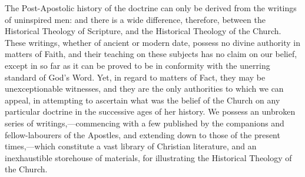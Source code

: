 \documentclass[
]{book}
\begin{document}
The Post-Apostolic history of the doctrine can only be derived from the writings of uninspired men: and there is a wide difference, therefore, between the Historical Theology of Scripture, and the Historical Theology of the Church. These writings, whether of ancient or modern date, possess no divine authority in matters of Faith, and their teaching on these subjects has no claim on our belief, except in so far as it can be proved to be in conformity with the unerring standard of God's Word. Yet, in regard to matters of Fact, they may be unexceptionable witnesses, and they are the only authorities to which we can appeal, in attempting to ascertain what was the belief of the Church on any particular doctrine in the successive ages of her history. We possess an unbroken series of writings,---commencing with a few published by the companions and fellow-labourers of the Apostles, and extending down to those of the present times,---which constitute a vast library of Christian literature, and an inexhaustible storehouse of materials, for illustrating the Historical Theology of the Church.
\end{document}
